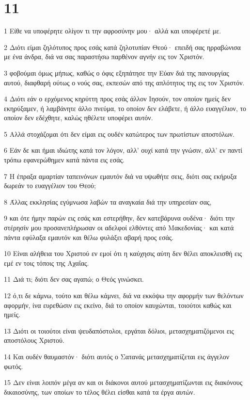 \chapter{11}

\par 1 Είθε να υποφέρητε ολίγον τι την αφροσύνην μου· αλλά και υποφέρετέ με.
\par 2 Διότι είμαι ζηλότυπος προς εσάς κατά ζηλοτυπίαν Θεού· επειδή σας ηρραβώνισα με ένα άνδρα, διά να σας παραστήσω παρθένον αγνήν εις τον Χριστόν.
\par 3 φοβούμαι όμως μήπως, καθώς ο όφις εξηπάτησε την Εύαν διά της πανουργίας αυτού, διαφθαρή ούτως ο νούς σας, εκπεσών από της απλότητος της εις τον Χριστόν.
\par 4 Διότι εάν ο ερχόμενος κηρύττη προς εσάς άλλον Ιησούν, τον οποίον ημείς δεν εκηρύξαμεν, ή λαμβάνητε άλλο πνεύμα, το οποίον δεν ελάβετε, ή άλλο ευαγγέλιον, το οποίον δεν εδέχθητε, καλώς ηθέλετε υποφέρει αυτόν.
\par 5 Αλλά στοχάζομαι ότι δεν είμαι εις ουδέν κατώτερος των πρωτίστων αποστόλων.
\par 6 Εάν δε και ήμαι ιδιώτης κατά τον λόγον, αλλ' ουχί κατά την γνώσιν, αλλ' εν παντί τρόπω εφανερώθημεν κατά πάντα εις εσάς.
\par 7 Η έπραξα αμαρτίαν ταπεινόνων εμαυτόν διά να υψωθήτε σεις, διότι σας εκήρυξα δωρεάν το ευαγγέλιον του Θεού;
\par 8 Άλλας εκκλησίας εγύμνωσα λαβών τα αναγκαία διά την υπηρεσίαν σας,
\par 9 και ότε ήμην παρών εις εσάς και εστερήθην, δεν κατεβάρυνα ουδένα· διότι την στέρησίν μου προσανεπλήρωσαν οι αδελφοί ελθόντες από Μακεδονίας· και κατά πάντα εφύλαξα εμαυτόν και θέλω φυλάξει αβαρή προς εσάς.
\par 10 Είναι αλήθεια του Χριστού εν εμοί ότι η καύχησις αύτη δεν θέλει αποκλεισθή εις εμέ εν τοις τόποις της Αχαΐας.
\par 11 Διά τι; διότι δεν σας αγαπώ; ο Θεός γινώσκει.
\par 12 ό,τι δε κάμνω, τούτο και θέλω κάμνει, διά να εκκόψω την αφορμήν των θελόντων αφορμήν, ίνα ευρεθώσιν εις εκείνο, διά το οποίον καυχώνται, τοιούτοι καθώς και ημείς.
\par 13 Διότι οι τοιούτοι είναι ψευδαπόστολοι, εργάται δόλιοι, μετασχηματιζόμενοι εις αποστόλους Χριστού.
\par 14 Και ουδέν θαυμαστόν· διότι αυτός ο Σατανάς μετασχηματίζεται εις άγγελον φωτός.
\par 15 Δεν είναι λοιπόν μέγα αν και οι διάκονοι αυτού μετασχηματίζωνται εις διακόνους δικαιοσύνης, των οποίων το τέλος θέλει είσθαι κατά τα έργα αυτών.
